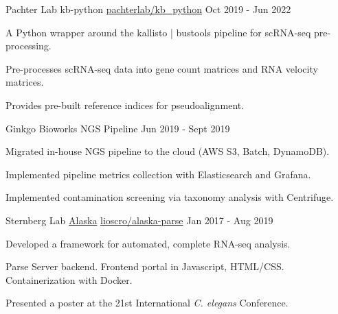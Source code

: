 \begin{cventries}
\cventry
  {Pachter Lab} %
  {kb-python} %
  {\faGithub\phantom{a}\href{https://github.com/pachterlab/kb_python}{pachterlab/kb\_python}} %
  {Oct 2019 - Jun 2022} %
  {
    \begin{cvitems} %
      \item {A Python wrapper around the kallisto | bustools pipeline for scRNA-seq pre-processing.}
      \item {Pre-processes scRNA-seq data into gene count matrices and RNA velocity matrices.}
      \item {Provides pre-built reference indices for pseudoalignment.}
    \end{cvitems}
  }

\cventry
  {Ginkgo Bioworks}
  {NGS Pipeline}
  {}
  {Jun 2019 - Sept 2019}
  {
   \begin{cvitems} %
     \item {Migrated in-house NGS pipeline to the cloud (AWS S3, Batch, DynamoDB).}
     \item {Implemented pipeline metrics collection with Elasticsearch and Grafana.}
     \item {Implemented contamination screening via taxonomy analysis with Centrifuge.}
    \end{cvitems}
  }

\cventry
  {Sternberg Lab}
  {\href{https://github.com/Lioscro/alaska-parse}{Alaska}}
  {\faGithub\phantom{a}\href{https://github.com/Lioscro/alaska-parse}{lioscro/alaska-parse}}
  {Jan 2017 - Aug 2019}
  {
   \begin{cvitems} %
     \item Developed a framework for automated, complete RNA-seq analysis.
     \item Parse Server backend. Frontend portal in Javascript, HTML/CSS. Containerization with Docker.
     \item Presented a poster at the 21st International \textit{C. elegans} Conference.
    \end{cvitems}
  }

\end{cventries}
